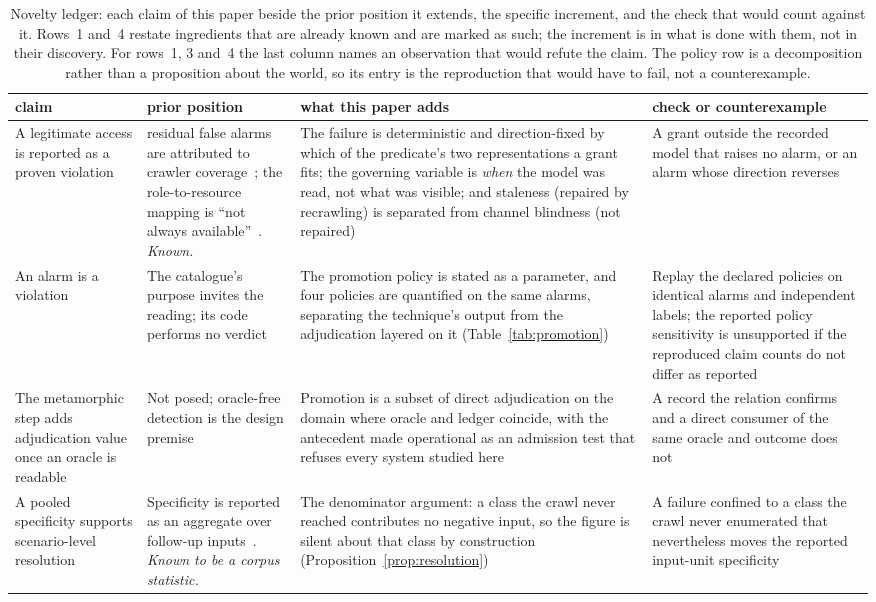 \begin{table}[t]
\centering
\caption{Novelty ledger: each claim of this paper beside the prior position it
extends, the specific increment, and the check that would count against it. Rows~1
and~4 restate ingredients that are already known and are marked as such; the
increment is in what is done with them, not in their discovery. For rows~1, 3
and~4 the last column names an observation that would refute the claim. The
policy row is a decomposition rather than a proposition about the world, so its
entry is the reproduction that would have to fail, not a counterexample.}
\label{tab:novelty}
\footnotesize
\begin{tabular}{@{}>{\RaggedRight\arraybackslash}p{}%
>{\RaggedRight\arraybackslash}p{}%
>{\RaggedRight\arraybackslash}p{}%
>{\RaggedRight\arraybackslash}p{}@{}}
\toprule
claim & prior position & what this paper adds & check or counterexample \\
\midrule
A legitimate access is reported as a proven violation
& residual false alarms are attributed to crawler coverage~\cite{Mai2019Metamorphic};
the role-to-resource mapping is ``not always
available''~\cite{Chaleshtari2022Metamorphic}. \emph{Known.}
& The failure is deterministic and direction-fixed by which of the predicate's two
representations a grant fits; the governing variable is \emph{when} the model was
read, not what was visible; and staleness (repaired by recrawling) is separated from
channel blindness (not repaired)
& A grant outside the recorded model that raises no alarm, or an alarm whose
direction reverses
\\
An alarm is a violation
& The catalogue's purpose invites the reading; its code performs no verdict
& The promotion policy is stated as a parameter, and four policies are quantified on
the same alarms, separating the technique's output from the adjudication layered on
it (Table~\ref{tab:promotion})
& Replay the declared policies on identical alarms and independent labels; the
reported policy sensitivity is unsupported if the reproduced claim counts do not
differ as reported
\\
The metamorphic step adds adjudication value once an oracle is readable
& Not posed; oracle-free detection is the design premise
& Promotion is a subset of direct adjudication on the domain where oracle and ledger
coincide, with the antecedent made operational as an admission test that refuses
every system studied here
& A record the relation confirms and a direct consumer of the same oracle and outcome
does not
\\
A pooled specificity supports scenario-level resolution
& Specificity is reported as an aggregate over follow-up
inputs~\cite{Chaleshtari2022Metamorphic}. \emph{Known to be a corpus statistic.}
& The denominator argument: a class the crawl never reached contributes no negative
input, so the figure is silent about that class by construction
(Proposition~\ref{prop:resolution})
& A failure confined to a class the crawl never enumerated that nevertheless moves
the reported input-unit specificity
\\
\bottomrule
\end{tabular}
\end{table}
